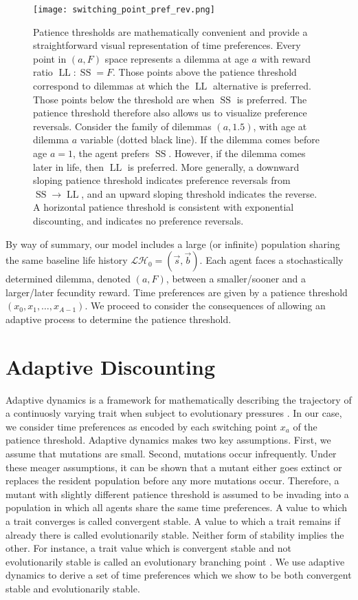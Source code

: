 \documentclass[titlepage, hidelinks, 12pt]{article}
\theoremstyle{plain}
\theoremstyle{remark}
\theoremstyle{definition}
\newcommand{\LH}{\mathcal{LH}}
\DeclareMathOperator{\smallersooner}{SS}
\DeclareMathOperator{\largerlater}{LL}
\begin{document}
\begin{figure}[H]
    \centering
    \texttt{[image: switching\_point\_pref\_rev.png]}
    \caption{Patience thresholds are mathematically convenient and provide a straightforward visual representation of time preferences. 
        Every point in $(a, F)$ space
    represents a dilemma at age $a$ with reward ratio $\largerlater : \smallersooner = F$. 
    Those points above the patience threshold correspond to dilemmas at which the $\largerlater$ alternative
is preferred. Those points below the threshold are when $\smallersooner$ is preferred. The patience threshold therefore also allows
us to visualize preference reversals. Consider the family of dilemmas $(a, 1.5)$, with age at dilemma $a$ variable (dotted black line). If the dilemma comes 
before age $a = 1$, the agent 
prefers $\smallersooner$. However, if the dilemma comes later in life, then $\largerlater$ is preferred. More generally, a
downward sloping patience threshold indicates preference reversals from $\smallersooner\to\largerlater$, and an upward sloping threshold
indicates the reverse. A horizontal patience threshold is consistent with exponential discounting, and indicates no preference reversals.
}
\end{figure}

By way of summary, our model includes a large (or infinite) population sharing the same baseline life history $\LH_0 = (\vec{s}, \vec{b}).$ 
Each agent faces a stochastically determined dilemma, denoted $(a, F)$, between a smaller/sooner and a larger/later fecundity reward. 
Time preferences are given by a patience threshold $(x_0, x_1, \ldots, x_{A-1})$. 
We proceed to consider the consequences of allowing an adaptive process to determine the patience threshold. 


\section{Adaptive Discounting}
Adaptive dynamics is a framework for mathematically describing the trajectory of a continuosly varying trait when subject to evolutionary pressures 
\cite{doebeli05}. In our case, we consider time preferences as encoded by each switching point $x_a$ of the patience threshold.
Adaptive dynamics makes two key assumptions. First, we assume that mutations are small. Second, mutations occur infrequently.
Under these meager assumptions, it can be shown that a mutant either goes extinct or replaces the resident population before any more mutations occur.
Therefore, a mutant with slightly different patience threshold is assumed to be invading into a population in which all agents share the same
time preferences. 
A value to which a trait converges is called convergent stable. A value to which a trait remains if already there is called evolutionarily stable.
Neither form of stability implies the other. For instance, a trait value which is convergent stable and not evolutionarily stable is called an
evolutionary branching point \cite{doebeli11}. We use adaptive dynamics
to derive a set of time preferences which we show to be both convergent stable and evolutionarily stable. 
\end{document}
